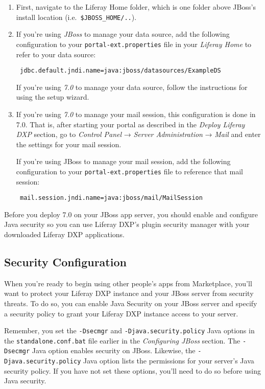 \begin{enumerate}
\def\labelenumi{\arabic{enumi}.}
\item
  First, navigate to the Liferay Home folder, which is one folder above
  JBoss's install location (i.e.~\texttt{\$JBOSS\_HOME/..}).
\item
  If you're using \emph{JBoss} to manage your data source, add the
  following configuration to your \texttt{portal-ext.properties} file in
  your \emph{Liferay Home} to refer to your data source:

\begin{verbatim}
 jdbc.default.jndi.name=java:jboss/datasources/ExampleDS
\end{verbatim}

  If you're using \emph{7.0} to manage your data source, follow the
  instructions for using the setup wizard.
\item
  If you're using \emph{7.0} to manage your mail session, this
  configuration is done in 7.0. That is, after starting your portal as
  described in the \emph{Deploy Liferay DXP} section, go to
  \emph{Control Panel} → \emph{Server Administration} → \emph{Mail} and
  enter the settings for your mail session.

  If you're using JBoss to manage your mail session, add the following
  configuration to your \texttt{portal-ext.properties} file to reference
  that mail session:

\begin{verbatim}
 mail.session.jndi.name=java:jboss/mail/MailSession
\end{verbatim}
\end{enumerate}

Before you deploy 7.0 on your JBoss app server, you should enable and
configure Java security so you can use Liferay DXP's plugin security
manager with your downloaded Liferay DXP applications.

\subsection{Security Configuration}\label{security-configuration-1}

When you're ready to begin using other people's apps from Marketplace,
you'll want to protect your Liferay DXP instance and your JBoss server
from security threats. To do so, you can enable Java Security on your
JBoss server and specify a security policy to grant your Liferay DXP
instance access to your server.

Remember, you set the \texttt{-Dsecmgr} and
\texttt{-Djava.security.policy} Java options in the
\texttt{standalone.conf.bat} file earlier in the \emph{Configuring
JBoss} section. The \texttt{-Dsecmgr} Java option enables security on
JBoss. Likewise, the \texttt{-Djava.security.policy} Java option lists
the permissions for your server's Java security policy. If you have not
set these options, you'll need to do so before using Java security.

